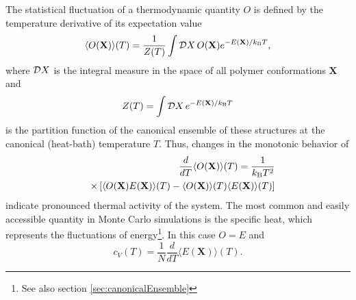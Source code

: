 \documentclass[12pt]{report}
\begin{document}
\newpage
 
The statistical fluctuation of a thermodynamic quantity $O$ is defined by the temperature derivative of its expectation value 
%
\begin{equation}
\langle O(\mathbf{X})\rangle(T)=\frac{1}{Z(T)}\int {\cal D}X\,
O(\mathbf{X}) e^{-E(\mathbf{X})/k_\mathrm{B}T},
\end{equation}
%
where ${\cal D}X$ is the integral measure in the space of all polymer conformations $\mathbf{X}$ and 
%
\begin{equation}
Z(T)=\int {\cal D}X\, e^{-E(\mathbf{X})/k_\mathrm{B}T}
\end{equation}
%
is the partition function of the canonical ensemble of these structures at the canonical (heat-bath) temperature $T$. Thus, changes in the monotonic behavior of 
%
\begin{eqnarray}
&&\hspace*{-7mm}\frac{d}{dT}\langle
O(\mathbf{X})\rangle(T)=\frac{1}{k_\mathrm{B}T^2}
\nonumber\\
&&\times
\left[\langle O(\mathbf{X})E(\mathbf{X})\rangle(T)-\langle
O(\mathbf{X})\rangle(T)\langle E(\mathbf{X})\rangle(T)\right]
\end{eqnarray}
%
indicate pronounced thermal activity of the system. The most common and easily accessible quantity in Monte Carlo simulations is the specific heat, which represents the fluctuations of energy\footnote{See also section\,\,\ref{sec:canonicalEnsemble}}. In this case $O=E$ and
%
\begin{equation}
c_V(T)=\frac{1}{N}\frac{d}{dT}\langle E(\mathbf{X})\rangle(T).
\end{equation}
%
\end{document}
